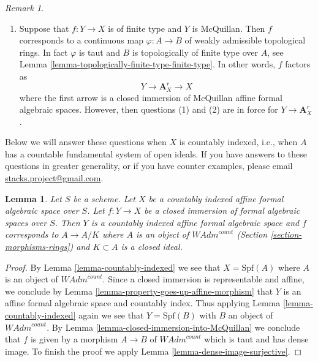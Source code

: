 \documentclass{stacks-project}
\theoremstyle{plain}
\newtheorem{lemma}[subsection]{Lemma}
\theoremstyle{definition}
\theoremstyle{remark}
\newtheorem{remark}[subsection]{Remark}
\numberwithin{equation}{subsection}
\begin{document}
\begin{remark}
\begin{enumerate}
Is there an example where $Y$ is not McQuillan?
\item Suppose that $f : Y \to X$ is of finite type and $Y$ is McQuillan.
Then $f$ corresponds to a continuous map $\varphi : A \to B$ of weakly
admissible topological rings. In fact $\varphi$ is taut and
$B$ is topologically of finite type over $A$, see
Lemma \ref{lemma-topologically-finite-type-finite-type}.
In other words, $f$ factors as
$$
Y \longrightarrow \mathbf{A}^r_X \longrightarrow X
$$
where the first arrow is a closed immersion of McQuillan affine
formal algebraic spaces. However, then questions (1) and
(2) are in force for $Y \to \mathbf{A}^r_X$.
\end{enumerate}
Below we will answer these questions when
$X$ is countably indexed, i.e., when $A$ has a countable fundamental
system of open ideals. If you have answers to these questions
in greater generality, or if you have counter examples, please email
\href{mailto:stacks.project@gmail.com}{stacks.project@gmail.com}.
\end{remark}

\begin{lemma}
\label{lemma-closed-immersion-into-countably-indexed}
Let $S$ be a scheme. Let $X$ be a countably indexed affine formal algebraic
space over $S$. Let $f : Y \to X$ be a closed immersion of formal algebraic
spaces over $S$. Then $Y$ is a countably indexed affine formal algebraic space
and $f$ corresponds to $A \to A/K$ where $A$ is an object of
$\textit{WAdm}^{count}$
(Section \ref{section-morphisms-rings})
and $K \subset A$ is a closed ideal.
\end{lemma}

\begin{proof}
By Lemma \ref{lemma-countably-indexed}
we see that $X = \text{Spf}(A)$ where $A$ is an object of
$\textit{WAdm}^{count}$. Since a closed immersion is representable
and affine, we conclude by Lemma \ref{lemma-property-goes-up-affine-morphism}
that $Y$ is an affine formal algebraic space and countably index.
Thus applying Lemma \ref{lemma-countably-indexed}
again we see that $Y = \text{Spf}(B)$ with $B$ an object of
$\textit{WAdm}^{count}$. By Lemma \ref{lemma-closed-immersion-into-McQuillan}
we conclude that $f$ is given by a morphism $A \to B$ of
$\textit{WAdm}^{count}$ which is taut and has dense image.
To finish the proof we apply
Lemma \ref{lemma-dense-image-surjective}.
\end{proof}
\end{document}
